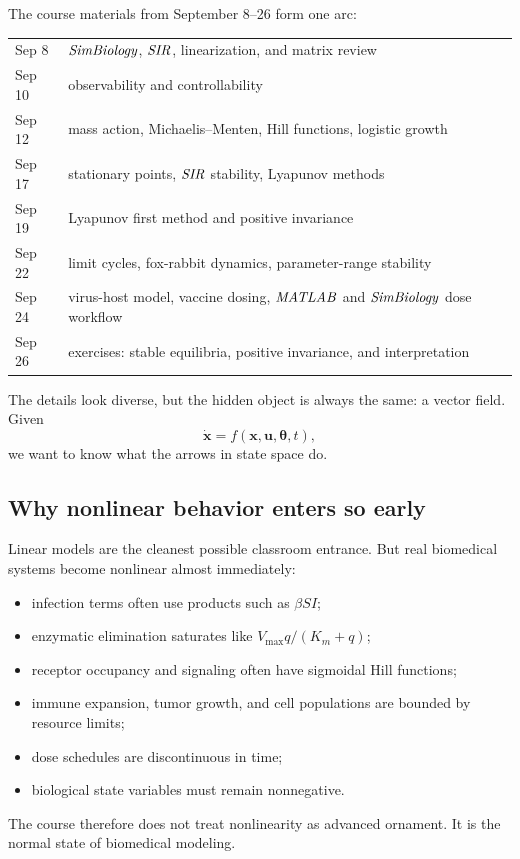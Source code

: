 \documentclass[a4paper]{article}
\newcommand{\vect}[1]{\boldsymbol{#1}}
\newcommand{\MATLAB}{\ensuremath{\pksym{MATLAB}}}
\newcommand{\SimBio}{\ensuremath{\pksym{SimBiology}}}
\newcommand{\SIR}{\ensuremath{\pksym{SIR}}}
\newcommand{\Vmax}{V_{\max}}
\newcommand{\Km}{K_m}
\begin{document}
The course materials from September 8--26 form one arc:
\begin{center}
\begin{tabularx}{0.92\textwidth}{@{}lX@{}}
Sep 8 & \SimBio{}, \SIR{}, linearization, and matrix review\\
Sep 10 & observability and controllability\\
Sep 12 & mass action, Michaelis--Menten, Hill functions, logistic growth\\
Sep 17 & stationary points, \SIR{} stability, Lyapunov methods\\
Sep 19 & Lyapunov first method and positive invariance\\
Sep 22 & limit cycles, fox-rabbit dynamics, parameter-range stability\\
Sep 24 & virus-host model, vaccine dosing, \MATLAB{} and \SimBio{} dose workflow\\
Sep 26 & exercises: stable equilibria, positive invariance, and interpretation
\end{tabularx}
\end{center}
The details look diverse, but the hidden object is always the same: a vector field. Given
\[
  \dot{\vect x}=f(\vect x,\vect u,\vect\theta,t),
\]
we want to know what the arrows in state space do.

\subsection{Why nonlinear behavior enters so early}

Linear models are the cleanest possible classroom entrance. But real biomedical systems become nonlinear almost immediately:
\begin{itemize}[leftmargin=2em]
  \item infection terms often use products such as \(\beta SI\);
  \item enzymatic elimination saturates like \(\Vmax q/(\Km+q)\);
  \item receptor occupancy and signaling often have sigmoidal Hill functions;
  \item immune expansion, tumor growth, and cell populations are bounded by resource limits;
  \item dose schedules are discontinuous in time;
  \item biological state variables must remain nonnegative.
\end{itemize}
The course therefore does not treat nonlinearity as advanced ornament. It is the normal state of biomedical modeling.
\end{document}

